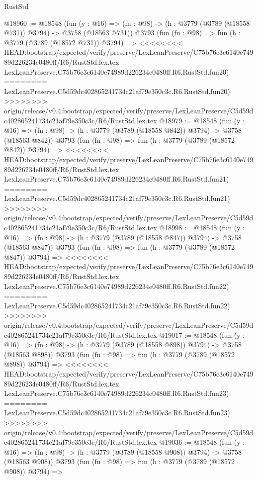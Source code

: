 \begin{lexlean}{RustStd}
\begin{coremodule}
{\begin{coremodule}
{{{{{{{{{{{{{{{{{{{{{{{{{{{{{{{@18960 := @18548
    (fun (y : @16) => (fn : @98) -> (h : @3779 (@3789 (@18558 @731)) @3794) -> @3758 (@18563 @731))
    @3793
    (fun (fn : @98) =>
    fun (h : @3779 (@3789 (@18572 @731)) @3794) =>
<<<<<<<< HEAD:bootstrap/expected/verify/preserve/LexLeanPreserve/C75b76e3c6140e74989d226234e0480ff/R6/RustStd.lex.tex
    LexLeanPreserve.C75b76e3c6140e74989d226234e0480ff.R6.RustStd.fun20)
========
    LexLeanPreserve.C5d59dc402865241734c21af79e350c3c.R6.RustStd.fun20)
>>>>>>>> origin/release/v0.4:bootstrap/expected/verify/preserve/LexLeanPreserve/C5d59dc402865241734c21af79e350c3c/R6/RustStd.lex.tex
@18979 := @18548
    (fun (y : @16) => (fn : @98) -> (h : @3779 (@3789 (@18558 @842)) @3794) -> @3758 (@18563 @842))
    @3793
    (fun (fn : @98) =>
    fun (h : @3779 (@3789 (@18572 @842)) @3794) =>
<<<<<<<< HEAD:bootstrap/expected/verify/preserve/LexLeanPreserve/C75b76e3c6140e74989d226234e0480ff/R6/RustStd.lex.tex
    LexLeanPreserve.C75b76e3c6140e74989d226234e0480ff.R6.RustStd.fun21)
========
    LexLeanPreserve.C5d59dc402865241734c21af79e350c3c.R6.RustStd.fun21)
>>>>>>>> origin/release/v0.4:bootstrap/expected/verify/preserve/LexLeanPreserve/C5d59dc402865241734c21af79e350c3c/R6/RustStd.lex.tex
@18998 := @18548
    (fun (y : @16) => (fn : @98) -> (h : @3779 (@3789 (@18558 @847)) @3794) -> @3758 (@18563 @847))
    @3793
    (fun (fn : @98) =>
    fun (h : @3779 (@3789 (@18572 @847)) @3794) =>
<<<<<<<< HEAD:bootstrap/expected/verify/preserve/LexLeanPreserve/C75b76e3c6140e74989d226234e0480ff/R6/RustStd.lex.tex
    LexLeanPreserve.C75b76e3c6140e74989d226234e0480ff.R6.RustStd.fun22)
========
    LexLeanPreserve.C5d59dc402865241734c21af79e350c3c.R6.RustStd.fun22)
>>>>>>>> origin/release/v0.4:bootstrap/expected/verify/preserve/LexLeanPreserve/C5d59dc402865241734c21af79e350c3c/R6/RustStd.lex.tex
@19017 := @18548
    (fun (y : @16) => (fn : @98) -> (h : @3779 (@3789 (@18558 @898)) @3794) -> @3758 (@18563 @898))
    @3793
    (fun (fn : @98) =>
    fun (h : @3779 (@3789 (@18572 @898)) @3794) =>
<<<<<<<< HEAD:bootstrap/expected/verify/preserve/LexLeanPreserve/C75b76e3c6140e74989d226234e0480ff/R6/RustStd.lex.tex
    LexLeanPreserve.C75b76e3c6140e74989d226234e0480ff.R6.RustStd.fun23)
========
    LexLeanPreserve.C5d59dc402865241734c21af79e350c3c.R6.RustStd.fun23)
>>>>>>>> origin/release/v0.4:bootstrap/expected/verify/preserve/LexLeanPreserve/C5d59dc402865241734c21af79e350c3c/R6/RustStd.lex.tex
@19036 := @18548
    (fun (y : @16) => (fn : @98) -> (h : @3779 (@3789 (@18558 @908)) @3794) -> @3758 (@18563 @908))
    @3793
    (fun (fn : @98) =>
    fun (h : @3779 (@3789 (@18572 @908)) @3794) =>
}}}}}}}}}}}}}}}}}}}}}}}}}}}}}}}
\end{coremodule}}
\end{coremodule}
\end{lexlean}
